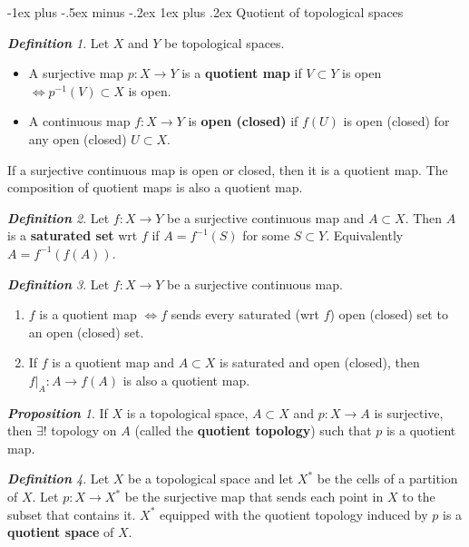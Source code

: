 \documentclass[frenchspacing,9pt,landscape,a4paper]{article}
\makeatletter
\renewcommand{\subsubsection}{\@startsection{subsubsection}{3}{0mm}%
                                {-1ex plus -.5ex minus -.2ex}%
                                {1ex plus .2ex}%
                                {\normalfont\small\bfseries}}
\theoremstyle{remark}
\newtheorem*{defn}{\textbf{Definition}}
\newtheorem*{prop}{\textbf{Proposition}}
\makeatother
\begin{document}
\begin{multicols}{4}
\subsubsection{Quotient of topological spaces}
\begin{defn}
    Let $X$ and  $Y$ be topological spaces.
     \begin{itemize}
         \item A surjective map $p:X\to Y$ is a \textbf{quotient map} if  $V\subset Y$ is open  $\iff
             p^{-1}(V)\subset X$ is open.
         \item A continuous map  $f:X\to Y$ is \textbf{open (closed)} if  $f(U)$ is open (closed) for any open
             (closed)  $U\subset X$.
    \end{itemize} If a surjective continuous map is open or closed, then it is a quotient map. The
    composition of quotient maps is also a quotient map.
\end{defn}
\begin{defn}
    Let $f:X\to Y$ be a surjective continuous map and  $A\subset X$. Then  $A$ is a \textbf{saturated set}
    wrt  $f$ if  $A=f^{-1}(S)$ for some  $S\subset Y$. Equivalently  $A=f^{-1}(f(A))$.
\end{defn}
\begin{defn}
    Let $f:X\to Y$ be a surjective continuous map.
     \begin{enumerate}
         \item $f$ is a quotient map  $\iff f$ sends every saturated (wrt $f$) open (closed) set to an open
             (closed) set.
         \item If $f$ is a quotient map and  $A\subset X$ is saturated and open (closed), then
             $f|_A:A\to f(A)$ is also a quotient map.
    \end{enumerate}
\end{defn}
\begin{prop}
    If $X$ is a topological space,  $A\subset X$ and  $p:X\to A$ is surjective, then  $\exists!$ topology
    on  $A$ (called the \textbf{quotient topology}) such that  $p$ is a quotient map.
\end{prop}
\begin{defn}
    Let $X$ be a topological space and let  $X^*$ be the cells of a partition of  $X$. Let  $p:X\to X^*$ be
    the surjective map that sends each point in  $X$ to the subset that contains it.  $X^*$ equipped
    with the quotient topology induced by  $p$ is a \textbf{quotient space} of $X$.
\end{defn}

\end{multicols}
\end{document}
